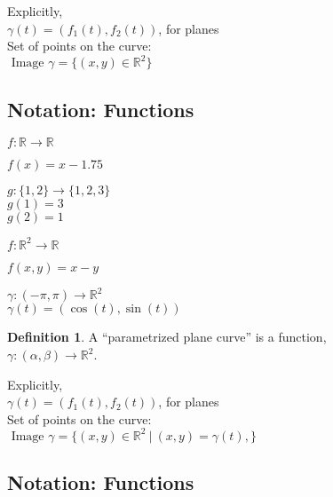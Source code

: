 \documentclass[twocolumn,20pt,fleqn]{extarticle}
\newcommand{\sep}{\vspace{0.5cm}}
\theoremstyle{plain}
\theoremstyle{definition}
\newtheorem*{definition}{Definition}
\theoremstyle{remark}
\begin{document}
Explicitly,\\
$\gamma(t) = (f_1(t), f_2(t))$, for planes\\

Set of points on the curve:\\  $\textrm{ Image } \gamma = \{(x,y) \in \mathbb{R}^2\}$


\clearpage




\subsection{Notation: Functions}

$ f: \mathbb{R}  \to \mathbb{R}$

$f(x) = x - 1.75$\\

\sep

  $g : \{1,2\} \to \{1,2,3\}$\\
    $g(1) = 3$\\
    $g(2) = 1$\\

\sep

$ f: \mathbb{R}^2  \to \mathbb{R}$

$f(  x,y  ) = x - y$


\sep

$\gamma :  (-\pi,\pi)  \to \mathbb{R}^2$\\
$\gamma(t) = (\cos(t), \sin(t))$



\newpage



\begin{definition}
  A  ``parametrized plane curve''  is a  function,\\ $\gamma  : (\alpha, \beta) \to \mathbb{R}^2$.
\end{definition}

Explicitly,\\
$\gamma(t) = (f_1(t), f_2(t))$, for planes\\

Set of points on the curve:\\  $\textrm{ Image } \gamma = \{(x,y) \in \mathbb{R}^2 \ |\ (x,y) = \gamma(t),\}$


\clearpage




\subsection{Notation: Functions}
\end{document}
